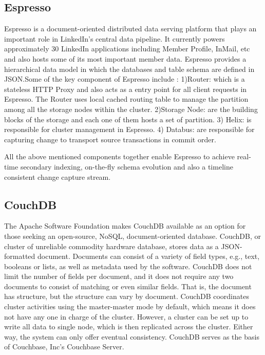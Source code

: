\subsection{ Espresso}

     Espresso \cite{www-Linkedin-Espresso} is a document-oriented
     distributed data serving platform that plays an important role in
     LinkedIn's central data pipeline. It currently powers
     approximately 30 LinkedIn applications including Member Profile,
     InMail, etc and also hosts some of its most important member
     data. Espresso provides a hierarchical data model in which the
     databases and table schema are defined in JSON.Some of the key
     component of Espresso include : 1)Router: which is a stateless
     HTTP Proxy and also acts as a entry point for all client requests
     in Espresso. The Router uses local cached routing table to manage
     the partition among all the storage nodes within the
     cluster. 2)Storage Node: are the building blocks of the storage
     and each one of them hosts a set of partition. 3) Helix: is
     responsible for cluster management in Espresso. 4) Databus: are
     responsible for capturing change to transport source transactions
     in commit order.

     All the above mentioned components together enable Espresso to achieve 
     real-time secondary indexing, on-the-fly schema evolution and also a 
     timeline consistent change capture stream.

\subsection{ CouchDB}
     
     The Apache Software Foundation makes CouchDB available as an
     option for those seeking an open-source, NoSQL, document-oriented
     database. CouchDB, or cluster of unreliable commodity hardware
     database, \cite{www-exploringcdb-couchdb} stores data as a
     JSON-formatted document.  Documents can consist of a variety of
     field types, e.g., text, booleans or lists, as well as metadata
     used by the software.  \cite{www-techoverview-couchdb} CouchDB
     does not limit the number of fields per document, and it does not
     require any two documents to consist of matching or even similar
     fields.  That is, the document has structure, but the structure
     can vary by document.  CouchDB coordinates cluster activities
     using the master-master mode by default, which means it does not
     have any one in charge of the cluster.  However, a cluster can be
     set up to write all data to single node, which is then replicated
     across the cluster.  Either way, the system can only offer
     eventual consistency.  \cite{www-cdb-vs-cbs-couchdb} CouchDB
     serves as the basis of Couchbase, Inc's Couchbase Server.

